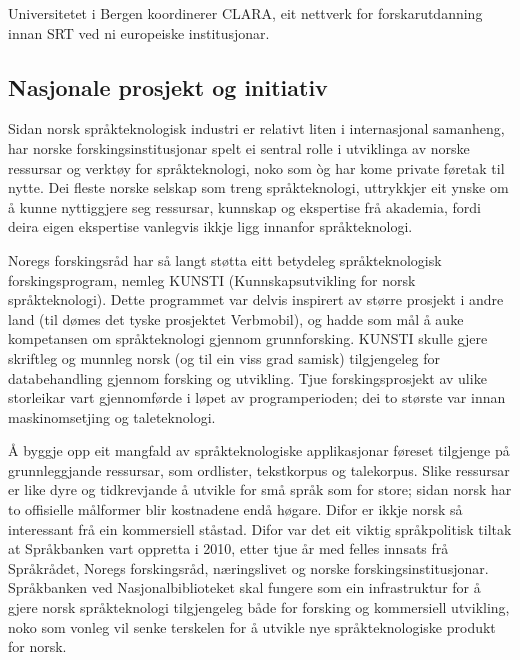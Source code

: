 \begin{multicols}{2}
Universitetet i Bergen koordinerer CLARA, eit nettverk for forskarutdanning innan SRT ved ni europeiske institusjonar.

\subsection{Nasjonale prosjekt og initiativ}

Sidan norsk språkteknologisk industri er relativt liten i internasjonal samanheng, har norske forskingsinstitusjonar spelt ei sentral rolle i utviklinga av norske ressursar og verktøy for språkteknologi, noko som òg har kome private føretak til nytte. 
Dei fleste norske selskap som treng språkteknologi, uttrykkjer eit ynske om å kunne nyttiggjere seg ressursar, kunnskap og ekspertise frå akademia, fordi deira eigen ekspertise vanlegvis ikkje ligg innanfor språkteknologi. 

Noregs forskingsråd har så langt støtta eitt betydeleg språkteknologisk forskingsprogram, nemleg KUNSTI (Kunnskapsutvikling for norsk språkteknologi). 
Dette programmet var delvis inspirert av større prosjekt i andre land (til dømes det tyske prosjektet Verbmobil), og hadde som mål å auke kompetansen om språkteknologi gjennom grunnforsking. KUNSTI skulle gjere skriftleg og munnleg norsk (og til ein viss grad samisk) tilgjengeleg for databehandling gjennom forsking og utvikling. Tjue forskingsprosjekt av ulike storleikar vart gjennomførde i løpet av programperioden; dei to største var innan maskinomsetjing og taleteknologi.

Å byggje opp eit mangfald av språkteknologiske applikasjonar føreset tilgjenge på grunnleggjande ressursar, som ordlister, tekstkorpus og talekorpus. Slike ressursar er like dyre og tidkrevjande å utvikle for små språk som for store; sidan norsk har to offisielle målformer blir kostnadene endå høgare. 
Difor er ikkje norsk så interessant frå ein kommersiell ståstad. Difor var det eit viktig språkpolitisk tiltak at Språkbanken vart oppretta i 2010, etter tjue år med felles innsats frå Språkrådet, Noregs forskingsråd, næringslivet og norske forskingsinstitusjonar. Språkbanken ved Nasjonalbiblioteket skal fungere som ein infrastruktur for å gjere norsk språkteknologi tilgjengeleg både for forsking og kommersiell utvikling, noko som vonleg vil senke terskelen for å utvikle nye språkteknologiske produkt for norsk. 


\end{multicols}
